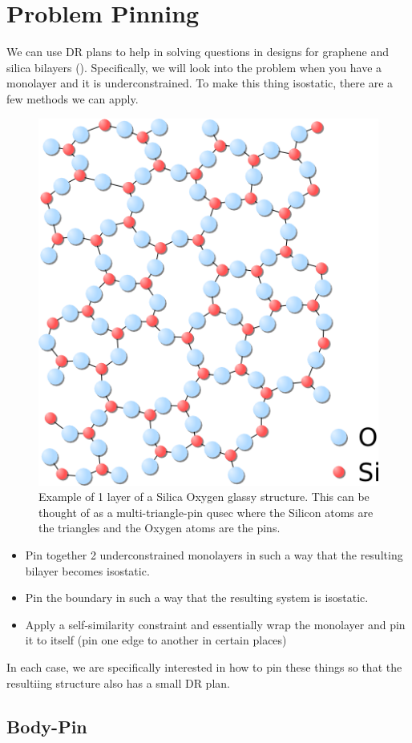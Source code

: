 \section{Problem Pinning}
\label{sec:bodypin}

We can use DR plans to help in solving questions in designs for graphene and silica bilayers (). Specifically, we will look into the problem when you have a monolayer and it is underconstrained. To make this thing isostatic, there are a few methods we can apply.

\begin{figure}\centering
    \includegraphics[width=0.5\linewidth]{img/Silica}
    \caption{Example of 1 layer of a Silica Oxygen glassy structure. This can be thought of as a multi-triangle-pin qusec where the Silicon atoms are the triangles and the Oxygen atoms are the pins.}
\end{figure}


\begin{itemize}
    \item Pin together 2 underconstrained monolayers in such a way that the resulting bilayer becomes isostatic.
    \item Pin the boundary in such a way that the resulting system is isostatic.
    \item Apply a self-similarity constraint and essentially wrap the monolayer and pin it to itself (pin one edge to another in certain places)
\end{itemize}

In each case, we are specifically interested in how to pin these things so that the resultiing structure also has a small DR plan.

\subsection{Body-Pin}


